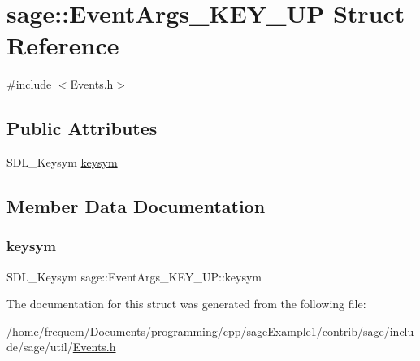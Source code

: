 \hypertarget{structsage_1_1EventArgs__KEY__UP}{}\section{sage\+::Event\+Args\+\_\+\+K\+E\+Y\+\_\+\+UP Struct Reference}
\label{structsage_1_1EventArgs__KEY__UP}


{\ttfamily \#include $<$Events.\+h$>$}

\subsection*{Public Attributes}
\begin{DoxyCompactItemize}
\item 
S\+D\+L\+\_\+\+Keysym \mbox{\hyperlink{structsage_1_1EventArgs__KEY__UP_af857682ed30e17a5d8fad60437208fc5}{keysym}}
\end{DoxyCompactItemize}


\subsection{Member Data Documentation}
\mbox{\label{structsage_1_1EventArgs__KEY__UP_af857682ed30e17a5d8fad60437208fc5}} 
\subsubsection{\texorpdfstring{keysym}{keysym}}
{\footnotesize\ttfamily S\+D\+L\+\_\+\+Keysym sage\+::\+Event\+Args\+\_\+\+K\+E\+Y\+\_\+\+U\+P\+::keysym}



The documentation for this struct was generated from the following file\+:\begin{DoxyCompactItemize}
\item 
/home/frequem/\+Documents/programming/cpp/sage\+Example1/contrib/sage/include/sage/util/\mbox{\hyperlink{Events_8h}{Events.\+h}}\end{DoxyCompactItemize}

